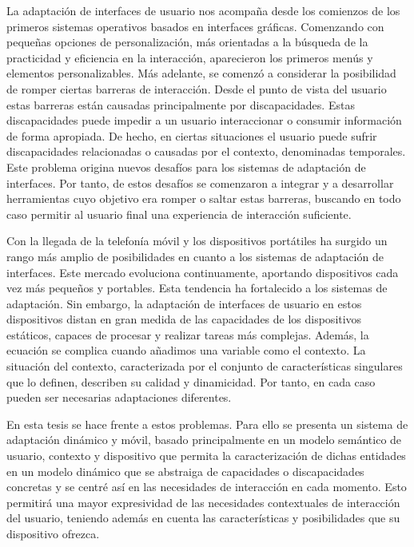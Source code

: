\begin{resumen} %

La adaptación de interfaces de usuario nos acompaña desde los comienzos de los
primeros sistemas operativos basados en interfaces gráficas. Comenzando con
pequeñas opciones de personalización, más orientadas a la búsqueda de la practicidad
y eficiencia en la interacción, aparecieron los primeros menús y elementos
personalizables. Más adelante, se comenzó a considerar la posibilidad de romper
ciertas barreras de interacción. Desde el punto de vista del usuario estas barreras
están causadas principalmente por discapacidades. Estas discapacidades puede impedir
a un usuario interaccionar o consumir información de forma apropiada. De hecho, 
en ciertas situaciones el usuario puede sufrir discapacidades relacionadas o 
causadas por el contexto, denominadas temporales. Este problema origina nuevos
desafíos para los sistemas de adaptación de interfaces. Por tanto, de estos desafíos
se comenzaron a integrar y a desarrollar herramientas cuyo objetivo era romper 
o saltar estas barreras, buscando en todo caso permitir al usuario final una 
experiencia de interacción suficiente.

Con la llegada de la telefonía móvil y los dispositivos portátiles ha surgido
un rango más amplio de posibilidades en cuanto a los sistemas de adaptación de
interfaces. Este mercado evoluciona continuamente, aportando dispositivos cada
vez más pequeños y portables. Esta tendencia ha fortalecido a los sistemas
de adaptación. Sin embargo, la adaptación de interfaces de usuario en estos 
dispositivos distan en gran medida de las capacidades de los dispositivos 
estáticos, capaces de procesar y realizar tareas más complejas. Además, la ecuación
se complica cuando añadimos una variable como el contexto. La situación del contexto,
caracterizada por el conjunto de características singulares que lo definen, describen
su calidad y dinamicidad. Por tanto, en cada caso pueden ser necesarias adaptaciones
diferentes.

En esta tesis se hace frente a estos problemas. Para ello se presenta un sistema
de adaptación dinámico y móvil, basado principalmente en un modelo semántico de
usuario, contexto y dispositivo que permita la caracterización de dichas
entidades en un modelo dinámico que se abstraiga de capacidades o discapacidades
concretas y se centré así en las necesidades de interacción en cada momento.
Esto permitirá una mayor expresividad de las necesidades contextuales de
interacción del usuario, teniendo además en cuenta las características y
posibilidades que su dispositivo ofrezca.


\end{resumen}











